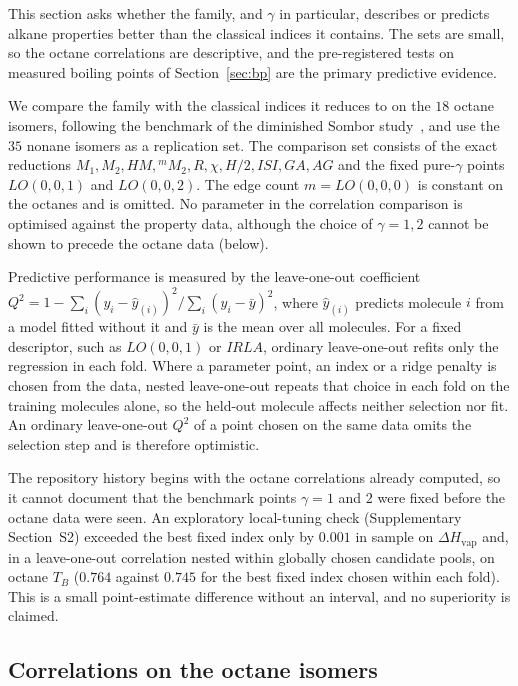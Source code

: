 \documentclass[a5paper, 10pt]{article}
\theoremstyle{plain}
\theoremstyle{remark}
\theoremstyle{definition}
\begin{document}
This section asks whether the family, and $\gamma$ in particular,
describes or predicts alkane properties better than the classical
indices it contains. The sets are small, so the octane
correlations are descriptive, and the pre-registered tests on measured
boiling points of Section~\ref{sec:bp} are the primary predictive
evidence.

We compare the family with the classical indices it reduces to on the
$18$ octane isomers, following the benchmark of the diminished Sombor
study~\cite{MovahediGutmanRedzepovicFurtula2026}, and use the $35$
nonane isomers as a replication set. The comparison set consists of
the exact reductions $M_1, M_2, HM, {}^{m}\!M_2, R, \chi, H/2, ISI, GA,
AG$ and the fixed pure-$\gamma$ points $LO(0, 0, 1)$ and $LO(0, 0, 2)$.
The edge count $m = LO(0, 0, 0)$ is constant on the octanes and is
omitted. No parameter in the correlation comparison is optimised against
the property data, although the choice of $\gamma = 1, 2$ cannot be
shown to precede the octane data (below).

Predictive performance is measured by the leave-one-out coefficient
$Q^2 = 1 - \sum_i (y_i - \hat y_{(i)})^2 / \sum_i (y_i - \bar y)^2$,
where $\hat y_{(i)}$ predicts molecule $i$ from a model fitted without it
and $\bar y$ is the mean over all molecules. For a fixed descriptor, such
as $LO(0,0,1)$ or $IRLA$, ordinary leave-one-out refits only the
regression in each fold. Where a parameter point, an index or a ridge
penalty is chosen from the data, nested leave-one-out repeats that
choice in each fold on the training molecules alone, so the held-out
molecule affects neither selection nor fit. An ordinary leave-one-out
$Q^2$ of a point chosen on the same data omits the selection step and is
therefore optimistic.

The repository history begins with the octane correlations already
computed, so it cannot document that the benchmark points $\gamma = 1$ and
$2$ were fixed before the octane data were seen. An exploratory local-tuning check (Supplementary
Section~S2) exceeded the best fixed index only by $0.001$ in sample on $\Delta H_{\mathrm{vap}}$ and, in a leave-one-out correlation nested within globally chosen candidate pools, on octane $T_B$ ($0.764$ against $0.745$ for the best fixed index chosen within each fold). This is a small point-estimate difference without an interval, and no superiority is claimed.

\subsection{Correlations on the octane isomers}\label{sec:octanes}
\end{document}
